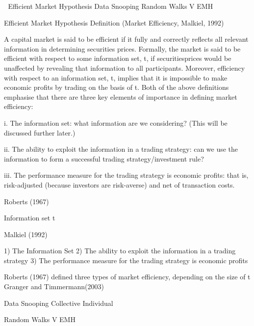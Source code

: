 

Efficient Market Hypothesis
Data Snooping
Random Walks V EMH

Efficient Market Hypothesis
Deﬁnition (Market Eﬃciency, Malkiel, 1992)

A capital market is said to be eﬃcient if it fully and correctly reﬂects all relevant information in determining securities prices. Formally, the market is said to be eﬃcient with respect to some information set, t, if securitiesprices would be unaﬀected by revealing that information to all participants. 
Moreover, eﬃciency with respect to an information set, t, implies that it is impossible to make economic proﬁts by trading on the basis of t.
Both of the above deﬁnitions emphasise that there are three key elements of importance in deﬁning market eﬃciency:

i. The information set: what information are we considering? (This will be discussed further later.)

ii. The ability to exploit the information in a trading strategy: can we use the information to form a successful trading strategy/investment rule?

iii. The performance measure for the trading strategy is economic proﬁts: that is, risk-adjusted (because investors are risk-averse) and net of transaction costs.
 
Roberts (1967)
 
Information set t

Malkiel (1992)
 
1) The Information Set
2) The ability to exploit the information in a trading strategy
3) The performance measure for the trading strategy is economic profits
 
Roberts (1967) defined three types of market efficiency, depending on the size of t
Granger and Timmermann(2003)
 
Data Snooping
Collective
Individual

Random Walks V EMH

